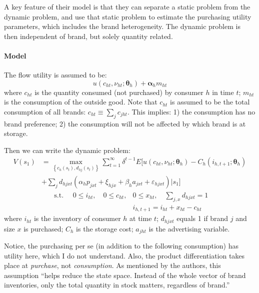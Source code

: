 A key feature of their model is that they can separate a static problem from the dynamic problem, and use that static problem to estimate the purchasing utility parameters, which includes the brand heterogeneity.
The dynamic problem is then independent of brand, but solely quantity related.

\paragraph{Model}

The flow utility is assumed to be:
\[
    u\left(c_{h t}, \nu_{h t} ; 
    \boldsymbol{\theta}_{h}\right)+\boldsymbol{\alpha}_{h} m_{h t}
\]
where $c_{ht}$ is the quantity consumed (not purchased) by consumer $h$ in time $t$; 
$m_{ht}$ is the consumption of the outside good.
Note that $c_{ht}$ is assumed to be the total consumption of all brands: 
$c_{ht} \equiv \sum_{j} c_{jht}$. 
This implies: 
1) the consumption has no brand preference;
2) the consumption will not be affected by which brand is at storage.

Then we can write the dynamic problem:
\begin{align*}
    V\left(s_{1}\right)
    &{=\max _{\left\{c_{h}\left(s_{t}\right), d_{h j}\left(s_{t}\right)\right\}} \sum_{t=1}^{\infty} \delta^{t-1} E[u\left(c_{h t}, \nu_{h t} ; \boldsymbol{\theta}_{h}\right)-C_{h}\left(i_{h, t+1} ; \boldsymbol{\theta}_{h}\right)}\\
    & +\sum_{j} d_{h j x t}\left(\alpha_{h} p_{j x t}+\xi_{h j x}+\beta_{h} a_{j x t}+\varepsilon_{h j x t}\right) | s_{1}]
\end{align*}
\[
    \begin{array}{ll}{\text { s.t. } \quad 0 \leq i_{h t}, \quad 0 \leq c_{h t},} & {0 \leq x_{h t}, \quad \sum_{j, x} d_{h j x t}=1} \\ {} & {i_{h, t+1}=i_{h t}+x_{h t}-c_{h t}}\end{array}
\]
where $i_{ht}$ is the inventory of consumer $h$ at time $t$; 
$d_{hjxt}$ equals 1 if brand $j$ and size $x$ is purchased;
$C_h$ is the storage cost;
$a_{jht}$ is the advertising variable.

Notice, the purchasing per se (in addition to the following consumption) has utility here, which I do not understand.
Also, the product differentiation takes place at \textit{purchase}, not \textit{consumption}.
As mentioned by the authors, this assumption ``helps reduce the state space. Instead of the whole vector of brand inventories, only the total quantity in stock matters, regardless of brand.''

